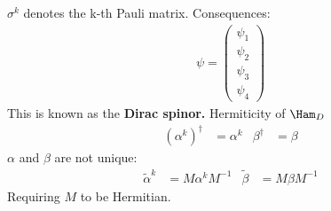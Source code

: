 \documentclass[a4paper, 11pt, normalem]{report}
\begin{document}
$\sigma^k$ denotes the k-th Pauli matrix.
Consequences:
\begin{align}
    \psi = \begin{pmatrix} \psi_1 \\ \psi_2 \\ \psi_3 \\ \psi_4\end{pmatrix}
\end{align}
This is known as the \textbf{Dirac spinor.}
Hermiticity of $\Ham_D$
\begin{align}
    (\alpha^k)^\dagger &= \alpha^k & \beta^\dagger &= \beta 
\end{align}
$\alpha$ and $\beta$ are not unique:
\begin{align}
    \tilde{\alpha}^k &= M\alpha^kM^{-1} & \tilde{\beta} &= M\beta M^{-1}
\end{align}
Requiring $M$ to be Hermitian.
\end{document}
